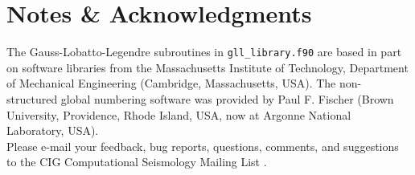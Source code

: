 
\chapter*{Notes \& Acknowledgments}


The Gauss-Lobatto-Legendre subroutines in \texttt{gll\_library.f90}
are based in part on software libraries from the Massachusetts Institute
of Technology, Department of Mechanical Engineering (Cambridge, Massachusetts, USA).
The non-structured global numbering software was provided by Paul
F. Fischer (Brown University, Providence, Rhode Island, USA, now at Argonne National Laboratory, USA).\\

Please e-mail your feedback, bug reports, questions, comments, and suggestions
to the CIG Computational Seismology Mailing List .



